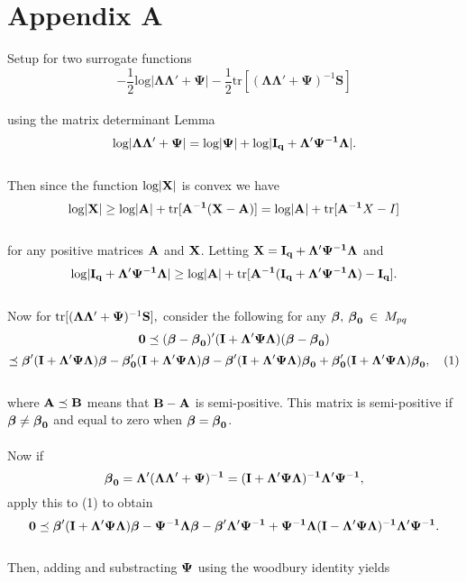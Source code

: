 \documentclass[11pt]{article}
\newcommand{\vecbeta}{\mbox{\boldmath$\beta$}}
\begin{document}
\section{Appendix A} 
Setup for two surrogate functions
\\
$$-\frac{1}{2}\text{log}|\boldsymbol{\Lambda\Lambda}'+\boldsymbol{\Psi}|-\frac{1}{2}\text{tr}[(\boldsymbol{\Lambda\Lambda}'+\boldsymbol{\Psi})^{-1}\mathbf{S}]$$
\\
using the matrix determinant Lemma
\\
$$\text{log}|\bold{\Lambda\Lambda'+\Psi}|=\text{log}|\bold{\Psi}|+\text{log}|\bold{I_q+\Lambda'\Psi^{-1}\Lambda}|.$$
\\
Then since the function $\text{log}|\bold{X}|$ is convex we have
\\
$$\text{log}|\bold{X}|\geq \text{log}|\bold{A}|+\text{tr}[\bold{A^{-1}(X-A)}]=\text{log}|\bold{A}|+\text{tr}[\bold{A^{-1}}X-I]$$
\\
for any positive matrices $\bold{A}$ and $\bold{X}$. Letting $\bold{X = I_q + \Lambda'\Psi^{-1}\Lambda}$ and
\\
$$\text{log}|\bold{I_q + \Lambda'\Psi^{-1}\Lambda}| \geq \text{log}|\bold{A}| + \text{tr}[\bold{A^{-1}(I_q+\Lambda'\Psi^{-1}\Lambda)-I_q}].$$
\\
Now for $\text{tr}[(\bold{\Lambda\Lambda'+\Psi})^{-1}\bold{S}],$ consider the following for any $\bold{\vecbeta,\: \vecbeta_0}\:\in\: M_{pq}$
\\
$$\bold{0} \preceq (\bold{\vecbeta-\vecbeta_0)'(I+\Lambda'\Psi\Lambda)(\vecbeta-\vecbeta_0})$$
$$\preceq \bold{\vecbeta'(I+\Lambda'\Psi\Lambda)\vecbeta-\vecbeta_0'(I+\Lambda'\Psi\Lambda)\vecbeta-\vecbeta'(I+\Lambda'\Psi\Lambda)\vecbeta_0+\vecbeta_0'(I+\Lambda'\Psi\Lambda)\vecbeta_0}, \quad (1)$$
\\
where $\bold{A\preceq B}$ means that $\bold{B-A}$ is semi-positive. This matrix is semi-positive if $\bold{\vecbeta \neq \vecbeta_0}$ and equal to zero when $\bold{\vecbeta = \vecbeta_0}$.\\
\\
Now if 
$$\bold{\vecbeta_0 = \Lambda'(\Lambda\Lambda'+\Psi)^{-1} = (I+\Lambda'\Psi\Lambda)^{-1}\Lambda'\Psi^{-1}},$$
apply this to (1) to obtain \\
$$\bold{0 \preceq \vecbeta'(I+\Lambda'\Psi\Lambda)\vecbeta-\Psi^{-1}\Lambda\vecbeta-\vecbeta'\Lambda'\Psi^{-1}+\Psi^{-1}\Lambda(I-\Lambda'\Psi\Lambda)^{-1}\Lambda'\Psi^{-1}}.$$
\\
Then, adding and substracting $\bold{\Psi}$ using the woodbury identity yields 
\end{document}
